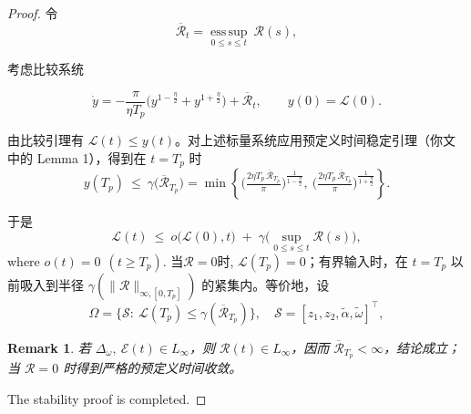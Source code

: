 \documentclass[pdflatex,sn-mathphys-num]{sn-jnl}%
\theoremstyle{thmstyleone}%
\theoremstyle{thmstyletwo}%
\newtheorem{remark}{Remark}%
\theoremstyle{thmstylethree}%
\begin{document}
\begin{proof}
令
$$
\overline{\mathcal{R}}_t=\underset{0\le s\le t}{\operatorname*{ess\,sup}}\ \mathcal{R}(s),
$$

考虑比较系统

$$
\dot y= -\frac{\pi}{\eta T_p}\Big(y^{1-\frac{\eta}{2}}+y^{1+\frac{\eta}{2}}\Big)+\overline{\mathcal{R}}_t,\qquad y(0)=\mathcal{L}(0).
$$

由比较引理有 $\mathcal{L}(t)\le y(t)$。对上述标量系统应用预定义时间稳定引理（你文中的 Lemma 1），得到在 $t=T_p$ 时
$$
y(T_p)\ \le\ 
\gamma\!\big(\overline{\mathcal{R}}_{T_p}\big)
=\min\!\left\{
\Big(\tfrac{2\eta T_p\,\overline{\mathcal{R}}_{T_p}}{\pi}\Big)^{\!\frac{1}{1-\frac{\eta}{2}}},
\ \Big(\tfrac{2\eta T_p\,\overline{\mathcal{R}}_{T_p}}{\pi}\Big)^{\!\frac{1}{1+\frac{\eta}{2}}}
\right\}.
$$

于是
$$
\mathcal{L}(t)\ \le\ o \big(\mathcal{L}(0),t\big)\;+\;\gamma\!\Big(\sup_{0\le s\le t}\mathcal{R}(s)\Big),
$$
where $o(t)=0\ \ (t\ge T_p)$. 当$\mathcal{R}=0$时, $\mathcal{L}(T_p)=0$；有界输入时，在 $t=T_p$ 以前吸入到半径 $\gamma(\|\mathcal{R}\|_{\infty,[0,T_p]})$ 的紧集内。等价地，设
$$
\Omega=\big\{\mathcal{S}:\ \mathcal{L}(T_p)\le \gamma(\overline{\mathcal{R}}_{T_p})\big\},\quad 
\mathcal{S}=[z_1,z_2,\tilde\alpha,\tilde\omega]^\top,
$$
\begin{remark}
	若 $\Delta_\omega,\ \mathcal{E}(t)\in L_\infty$，则 $\mathcal{R}(t)\in L_\infty$，因而 $\overline{\mathcal{R}}_{T_p}<\infty$，结论成立；当 $\mathcal{R}=0$ 时得到严格的预定义时间收敛。
\end{remark}




The stability proof is completed.

\end{proof}
\end{document}
